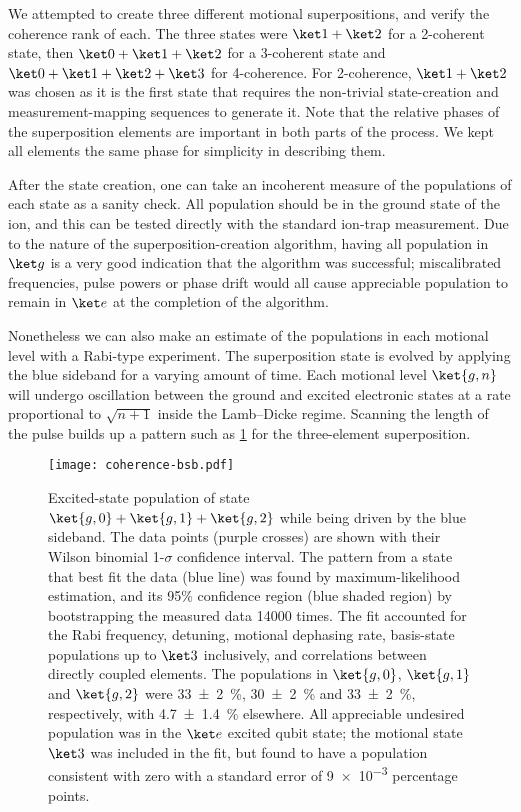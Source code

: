 We attempted to create three different motional superpositions, and verify the coherence rank of each.
The three states were $\ket1+\ket2$ for a 2-coherent state, then $\ket0+\ket1+\ket2$ for a 3-coherent state and $\ket0+\ket1+\ket2+\ket3$ for 4-coherence.
For 2-coherence, $\ket1+\ket2$ was chosen as it is the first state that requires the non-trivial state-creation and measurement-mapping sequences to generate it.
Note that the relative phases of the superposition elements are important in both parts of the process.
We kept all elements the same phase for simplicity in describing them.

After the state creation, one can take an incoherent measure of the populations of each state as a sanity check.
All population should be in the ground state of the ion, and this can be tested directly with the standard ion-trap measurement.
Due to the nature of the superposition-creation algorithm, having all population in $\ket g$ is a very good indication that the algorithm was successful; miscalibrated frequencies, pulse powers or phase drift would all cause appreciable population to remain in $\ket e$ at the completion of the algorithm.

Nonetheless we can also make an estimate of the populations in each motional level with a Rabi-type experiment.
The superposition state is evolved by applying the blue sideband for a varying amount of time.
Each motional level $\ket{g,n}$ will undergo oscillation between the ground and excited electronic states at a rate proportional to $\sqrt{n+1}$ inside the Lamb--Dicke regime.
Scanning the length of the pulse builds up a pattern such as \cref{fig:coherence-bsb} for the three-element superposition.

\begin{figure*}%
    \texttt{[image: coherence-bsb.pdf]}%
    \caption[Dynamics of the motional blue sideband transition]{\label{fig:coherence-bsb}%
    Excited-state population of state $\ket{g,0} + \ket{g,1} + \ket{g,2}$ while being driven by the blue sideband.
    The data points (purple crosses) are shown with their Wilson binomial 1-$\sigma$ confidence interval.
    The pattern from a state that best fit the data (blue line) was found by maximum-likelihood estimation, and its 95\% confidence region (blue shaded region) by bootstrapping the measured data \num{14000} times.
    The fit accounted for the Rabi frequency, detuning, motional dephasing rate, basis-state populations up to $\ket3$ inclusively, and correlations between directly coupled elements.
    The populations in $\ket{g,0}$, $\ket{g,1}$ and $\ket{g,2}$ were \SI{33(2)}{\percent}, \SI{30(2)}{\percent} and \SI{33(2)}{\percent}, respectively, with \SI{4.7(14)}{\percent} elsewhere.
    All appreciable undesired population was in the $\ket e$ excited qubit state; the motional state $\ket3$ was included in the fit, but found to have a population consistent with zero with a standard error of \num{9e-3} percentage points.
}
\end{figure*}

